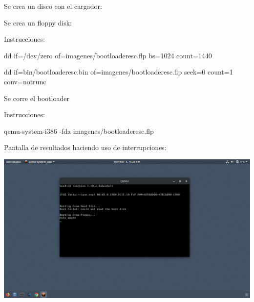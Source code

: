 \documentclass[12pt, a4paper]{report}
\begin{document}
\begin{center}
Se crea un disco con el cargador:

Se crea un floppy disk:

Instrucciones: 
\bigskip

dd if=/dev/zero of=imagenes/bootloaderesc.flp bs=1024 count=1440

\bigskip

dd if=bin/bootloaderesc.bin of=imagenes/bootloaderesc.flp seek=0 count=1 conv=notrunc

\bigskip

Se corre el bootloader

\bigskip

Instrucciones:

\bigskip

qemu-system-i386 -fda imagenes/bootloaderesc.flp

\bigskip

Pantalla de resultados haciendo uso de interrupciones:

\bigskip

\includegraphics[scale=.3]{int1.png}

\bigskip

\end{center}

\newpage
\end{document}
